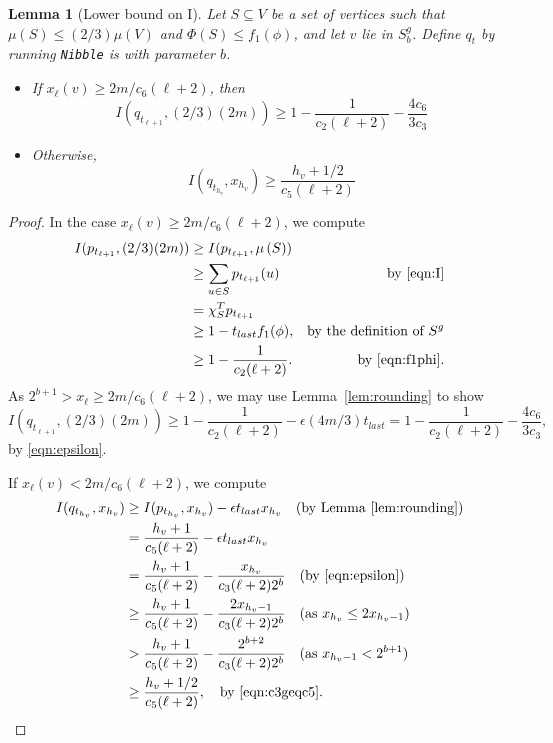 \documentclass[11pt]{article}
\newtheorem{lemma}[theorem]{Lemma}
\def\vol#1{\mu \left(#1  \right)}
\begin{document}
\begin{lemma}[Lower bound on I]\label{lem:lowerBound}
Let $S \subseteq V$ be a set of vertices
  such that
  $\vol{S} \leq (2/3) \vol{V}$ and
  $\Phi (S) \leq f_{1} (\phi )$, and
  let $v$ lie in $S^{g}_{b}$.
Define $q_{t}$ by running 
 \texttt{Nibble} is with parameter $b$.
\begin{itemize}
\item [1.] If $x_{\ell} (v) \geq  2m / c_{6} (\ell + 2)$, then
\begin{equation}\label{eqn:lower1}
I (q_{t_{\ell + 1}}, (2/3) (2m)) \geq 
1 - \frac{1}{c_{2} (\ell + 2)} - \frac{4 c_{6}}{3 c_{3}}
\end{equation}
\item [2.] Otherwise,
\begin{equation}\label{eqn:lower2}
I (q_{t_{h_{v}}}, x_{h_{v}}) \geq \frac{h_{v} + 1/2}{c_{5} (\ell +2)}
\end{equation}
\end{itemize}
\end{lemma}
\begin{proof}
In the case $x_{\ell} (v) \geq 2m / c_{6} (\ell + 2)$, we compute
\begin{align*}
  I (p_{t_{\ell + 1}}, (2/3) (2m)) 
& \geq 
  I (p_{t_{\ell + 1}}, \vol{S}) 
\\
& \geq \sum_{u \in S} p_{t_{\ell + 1}} (u) 
& \text{by \eqref{eqn:I}}
\\
& =
  \chi_{S}^{T} p_{t_{\ell + 1}}
\\
& \geq 
  1- t_{last} f_{1} (\phi),
& \text{by the definition of $S^{g}$}
\\
& \geq 
1 - \frac{1}{c_{2} (\ell + 2)}.
& \text{by \eqref{eqn:f1phi}}.
\end{align*}
As $2^{b+1} > x_{\ell} \geq 2m / c_{6} (\ell + 2)$, we may use
 Lemma~\ref{lem:rounding} 
  to show
\[
I (q_{t_{\ell + 1}}, (2/3) (2m)) \geq 
1 - \frac{1}{c_{2} (\ell + 2)} - \epsilon (4m/3) t_{last}
=
1 - \frac{1}{c_{2} (\ell + 2)} - \frac{4 c_{6}}{3 c_{3}},
\]
by  \eqref{eqn:epsilon}.

If $x_{\ell} (v) < 2m / c_{6} (\ell + 2)$, we compute
\begin{align}
I (q_{t_{h_{v}}}, x_{h_{v}})
& \geq
I (p_{t_{h_{v}}}, x_{h_{v}}) - \epsilon t_{last} x_{h_{v}}
\quad \text{(by Lemma~\ref{lem:rounding})}
\notag
\\
& =
\frac{h_{v} + 1}{c_{5} (\ell +2)} - \epsilon t_{last} x_{h_{v}}
\notag
\\
& =
\frac{h_{v} + 1}{c_{5} (\ell +2)} -
  \frac{x_{h_{v}}}{c_{3} (\ell+2)  2^{b}}
\quad \text{(by \eqref{eqn:epsilon})}
\notag
\\
& \geq
\frac{h_{v} + 1}{c_{5} (\ell +2)} -
  \frac{2 x_{h_{v}-1}}{c_{3} (\ell+2) 2^{b}}
\quad \text{(as $x_{h_{v}} \leq 2 x_{h_{v}-1}$)}
\notag
\\
& >
\frac{h_{v} + 1}{c_{5} (\ell +2)} -
  \frac{2^{b+2}}{c_{3} (\ell+2) 2^{b}}
\quad \text{(as $x_{h_{v}-1} < 2^{b+1}$)}
\notag
\\
&\geq
\frac{h_{v} + 1/2}{c_{5} (\ell +2)},
\quad \text{by \eqref{eqn:c3geqc5}}.
\notag
\end{align}
\end{proof}
\end{document}
